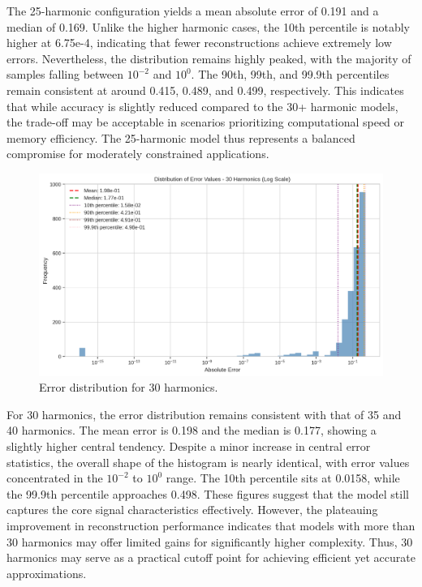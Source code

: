 \documentclass[preprint,12pt]{elsarticle}
\begin{document}
The 25-harmonic configuration yields a mean absolute error of 0.191 and a median of 0.169. Unlike the higher harmonic cases, the 10th percentile is notably higher at 6.75e-4, indicating that fewer reconstructions achieve extremely low errors. Nevertheless, the distribution remains highly peaked, with the majority of samples falling between \(10^{-2}\) and \(10^{0}\). The 90th, 99th, and 99.9th percentiles remain consistent at around 0.415, 0.489, and 0.499, respectively. This indicates that while accuracy is slightly reduced compared to the 30+ harmonic models, the trade-off may be acceptable in scenarios prioritizing computational speed or memory efficiency. The 25-harmonic model thus represents a balanced compromise for moderately constrained applications.

\begin{figure}[t]
    \centering
    \includegraphics[width=0.9\linewidth]{figures/error_distribution_30h.png}
    \caption{Error distribution for 30 harmonics.}
    \label{fig:error_30h}
\end{figure}

For 30 harmonics, the error distribution remains consistent with that of 35 and 40 harmonics. The mean error is 0.198 and the median is 0.177, showing a slightly higher central tendency. Despite a minor increase in central error statistics, the overall shape of the histogram is nearly identical, with error values concentrated in the \(10^{-2}\) to \(10^{0}\) range. The 10th percentile sits at 0.0158, while the 99.9th percentile approaches 0.498. These figures suggest that the model still captures the core signal characteristics effectively. However, the plateauing improvement in reconstruction performance indicates that models with more than 30 harmonics may offer limited gains for significantly higher complexity. Thus, 30 harmonics may serve as a practical cutoff point for achieving efficient yet accurate approximations.
\end{document}
